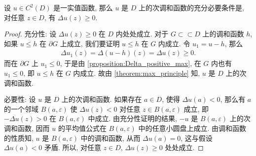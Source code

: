 \documentclass[../../main.tex]{subfiles}%
\begin{document}
\begin{theorem}
\label{theorem:laplacian_characterization}
设 \(u \in C^2(D)\) 是一实值函数, 那么 \(u\) 是 \(D\) 上的次调和函数的充分必要条件是, 对任意 \(z \in D\), 有 \(\Delta u(z) \geqslant 0\).
\end{theorem}
\begin{proof}

{\heiti 充分性:} 设 \(\Delta u(z) \geqslant 0\) 在 \(D\) 内处处成立. 对于 \(G \subset\subset D\) 上的调和函数 \(h\), 如果 \(u \leqslant h\) 在 \(\partial G\) 上成立, 我们要证明 \(u \leqslant h\) 在 \(G\) 内成立. 令 \(u_1 = u - h\), 那么
\begin{align*}
\Delta u_1(z) = \Delta(u-h)(z) = \Delta u(z) \geqslant 0.
\end{align*}
而在 \(\partial G\) 上 \(u_1 \leqslant 0\), 于是由 \cref{proposition:Delta_positive_max}, 在 \(G\) 内也有 \(u_1 \leqslant 0\), 即 \(u \leqslant h\) 在 \(G\) 内成立. 故由 \cref{theorem:max_principle} 知, \(u\) 是 \(D\) 上的次调和函数.

{\heiti 必要性:} 设 \(u\) 是 \(D\) 上的次调和函数. 如果存在 \(a \in D\), 使得 \(\Delta u(a) < 0\), 那么有 \(a\) 的一个邻域 \(B(a,\varepsilon)\) 使 \(\Delta u(z) < 0\) 对任意 \(z \in B(a,\varepsilon)\) 成立, 即 \(-\Delta u(z) > 0\) 在 \(B(a,\varepsilon)\) 中成立. 由充分性证明的结果, \(-u\) 是 \(B(a,\varepsilon)\) 上的次调和函数, 因而 \(u\) 的平均值公式在 \(B(a,\varepsilon)\) 中的任意小圆盘上成立. 由调和函数的性质知, \(u\) 是 \(B(a,\varepsilon)\) 中的调和函数, 从而 \(\Delta u(a) = 0\), 这与假设 \(\Delta u(a) < 0\) 矛盾. 所以, 对任意 \(z \in D\), \(\Delta u(z) \geqslant 0\) 处处成立.
\end{proof}
\end{document}
